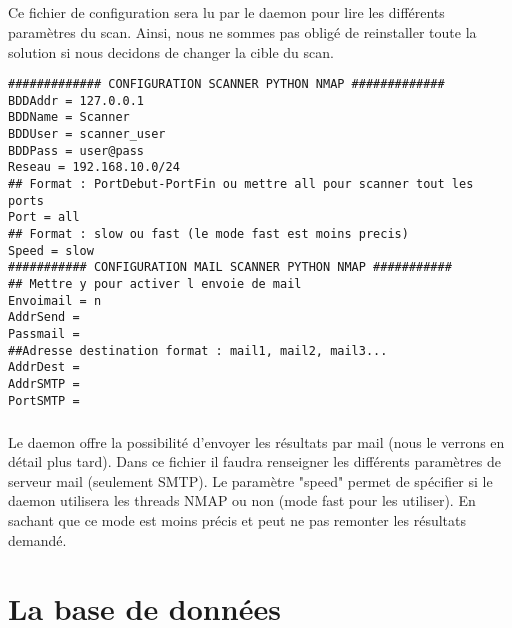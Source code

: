 \documentclass[12pt]{report}
\begin{document}
		\paragraph{}
			Ce fichier de configuration sera lu par le daemon pour lire les différents paramètres du scan. Ainsi, nous ne sommes pas obligé de reinstaller toute la solution si nous decidons de changer la cible du scan.
			\begin{lstlisting}[caption=Exemple fichier de configuration, captionpos=b]
############# CONFIGURATION SCANNER PYTHON NMAP #############
BDDAddr = 127.0.0.1
BDDName = Scanner
BDDUser = scanner_user
BDDPass = user@pass
Reseau = 192.168.10.0/24
## Format : PortDebut-PortFin ou mettre all pour scanner tout les ports
Port = all
## Format : slow ou fast (le mode fast est moins precis)
Speed = slow
########### CONFIGURATION MAIL SCANNER PYTHON NMAP ###########
## Mettre y pour activer l envoie de mail
Envoimail = n
AddrSend = 
Passmail = 
##Adresse destination format : mail1, mail2, mail3...
AddrDest = 
AddrSMTP = 
PortSMTP =

			\end{lstlisting}
		\paragraph{}
			Le daemon offre la possibilité d'envoyer les résultats par mail (nous le verrons en détail plus tard). Dans ce fichier il faudra renseigner les différents paramètres de serveur mail (seulement SMTP). Le paramètre "speed" permet de spécifier si le daemon utilisera les threads NMAP ou non (mode fast pour les utiliser). En sachant que ce mode est moins précis et peut ne pas remonter les résultats demandé.
	\chapter{La base de données}
\end{document}
